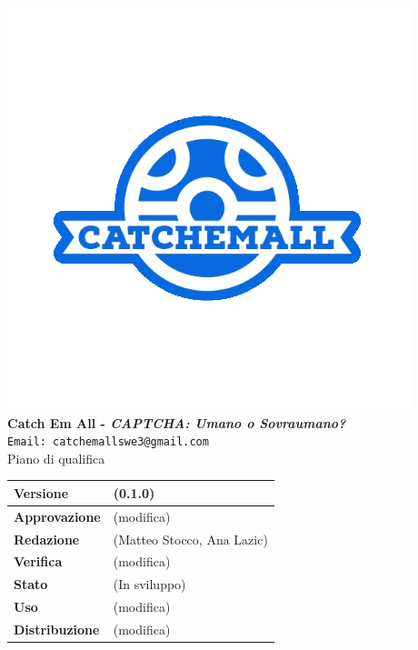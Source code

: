 \begin{titlepage}
\begin{center}
	\includegraphics[scale = 1.5]{img/logo.png}\\
	\bigskip
	\large \textbf{Catch Em All - \textit{CAPTCHA: Umano o Sovraumano?}}\\
	\texttt{Email: catchemallswe3@gmail.com}\\
	\vfill
	{\fontsize{1.5cm}{0}\selectfont Piano di qualifica}\\
	\vfill
	\begin{table}[h]
		\centering
		\setlength\extrarowheight{4pt}
		\begin{tabular}{| C{4.5cm} | C{4.5cm} |}
			\hline
			\textbf{Versione} & (0.1.0)\\
			\hline
			\textbf{Approvazione} & (modifica)\\
			\hline
			\textbf{Redazione} & (Matteo Stocco, Ana Lazic)\\
			\hline
			\textbf{Verifica} & (modifica)\\
			\hline
			\textbf{Stato} & (In sviluppo)\\
			\hline
			\textbf{Uso} & (modifica)\\
			\hline
			\textbf{Distribuzione} & (modifica)\\
			\hline
		\end{tabular}\\
	\end{table}
	
\end{center}
\end{titlepage}

